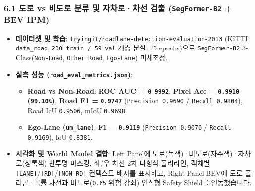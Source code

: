 \documentclass[10.5pt,a4paper]{article}
\begin{document}
\subsubsection{6.1 도로 vs 비도로 분류 및 자차로·차선 검출 (\texttt{SegFormer-\allowbreak{}B2} + BEV IPM)}
\begin{itemize}[leftmargin=1.5em,itemsep=2pt]
\item \textbf{데이터셋 및 학습}: \texttt{tryingit/\allowbreak{}roadlane-\allowbreak{}detection-\allowbreak{}evaluation-\allowbreak{}2013} (KITTI \texttt{data\_\allowbreak{}road}, \texttt{230 train /\allowbreak{} 59 val} 계층 분할, 25 epochs)으로 \texttt{SegFormer-\allowbreak{}B2} 3-Class(\texttt{Non-\allowbreak{}Road}, \texttt{Other Road}, \texttt{Ego-\allowbreak{}Lane}) 미세조정.
\item \textbf{실측 성능 (\href{https://github.com/Heisnotanimposter/Totalcare\_autonomous\_driving\_Yolov5/blob/main/results/v4\_road\_lane/road\_outputs/road\_lane\_outputs/road\_eval\_metrics.json}{\texttt{road\_\allowbreak{}eval\_\allowbreak{}metrics.\allowbreak{}json}})}:
\begin{itemize}[leftmargin=1.5em,itemsep=2pt]
\item \textbf{Road vs Non-Road}: \textbf{ROC AUC = \texttt{0.\allowbreak{}9992}}, \textbf{Pixel Acc = \texttt{0.\allowbreak{}9910} (\texttt{99.\allowbreak{}10\%})}, \textbf{Road F1 = \texttt{0.\allowbreak{}9747}} (\texttt{Precision 0.\allowbreak{}9690} / \texttt{Recall 0.\allowbreak{}9804}), Road IoU \texttt{0.\allowbreak{}9506}, mIoU \texttt{0.\allowbreak{}9698}.
\item \textbf{Ego-Lane (\texttt{um\_\allowbreak{}lane})}: \textbf{F1 = \texttt{0.\allowbreak{}9119}} (\texttt{Precision 0.\allowbreak{}9070} / \texttt{Recall 0.\allowbreak{}9169}), IoU \texttt{0.\allowbreak{}8381}.
\end{itemize}
\item \textbf{시각화 및 World Model 결합}: Left Panel에 도로(녹색)·비도로(자주색)·자차로(청록색) 반투명 마스킹, 좌/우 차선 2차 다항식 폴리라인, 객체별 \texttt{[LANE]}/\texttt{[RD]}/\texttt{[NON-\allowbreak{}RD]} 컨텍스트 배지를 표시하고, Right Panel BEV에 도로 폴리곤·곡률 차선과 비도로(\texttt{0.\allowbreak{}65} 위험 감쇠) 인식형 Safety Shield를 연동했습니다.
\end{itemize}
\end{document}
